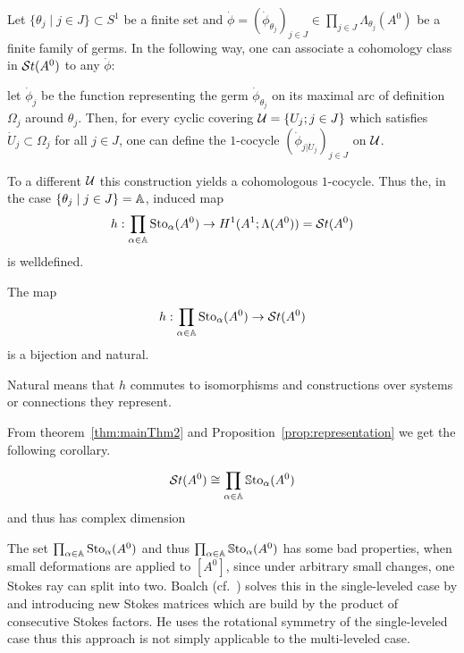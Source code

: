 Let $\{\theta_j\mid j\in J\}\subset S^1$ be a finite set and
$\dot\phi=(\dot\phi_{\theta_j})_{j\in J}
\in\prod_{j\in J}\Lambda_{\theta_j}(A^0)$ be a finite family of germs.
In the following way, one can associate a cohomology class in $\mathcal{S}{}t(A^0)$ to any
$\dot\phi$:
\begin{einr}
  let $\dot\phi_j$ be the function representing the germ
  $\dot\phi_{\theta_j}$ on its maximal arc of definition $\Omega_j$ around
  $\theta_j$.
  Then, for every cyclic covering $\mathcal{U}=\{U_j;j\in J\}$ which satisfies
  $\dot U_j\subset \Omega_j$ for all $j\in J$, one can define the $1$-cocycle
  $(\dot\phi_{j|\dot U_j})_{j\in J}$ on $\mathcal{U}$.
\end{einr}
To a different $\mathcal{U}$ this construction yields a cohomologous
$1$-cocycle\TODO[Proof]. Thus the, in the case $\{\theta_j\mid j\in J\}=\mathbb{A}$,
induced map
\[
  h:\prod_{\alpha\in\mathbb{A}}\operatorname{Sto}_\alpha(A^0)\to
  H^1(A^1;\Lambda(A^0))=\mathcal{S}{}t(A^0)
\]
is welldefined.
\begin{tthm}
  \label{thm:mainThm2}
  The map
  \[
    h:\prod_{\alpha\in\mathbb{A}}\operatorname{Sto}_\alpha(A^0)\to\mathcal{S}{}t(A^0)
  \]
  is a bijection and natural.
  \begin{s-rem}
    Natural means that $h$ commutes to isomorphisms and constructions over
    systems or connections they represent.
    \begin{comment}
      See \cite{Loday1994} Section III.3.3
    \end{comment}
  \end{s-rem}
\end{tthm}
From theorem~\ref{thm:mainThm2} and Proposition~\ref{prop:representation} we
get the following corollary.
\begin{cor}
  \[
    \mathcal{S}{}t(A^0) \cong \prod_{\alpha\in\mathbb{A}}\operatorname{\mathbb{S}to}_\alpha(A^0)
  \]
  and thus has complex dimension \TODO{}
\end{cor}
\begin{rem}
  The set $\prod_{\alpha\in\mathbb{A}}\operatorname{Sto}_\alpha(A^0)$ and thus
  $\prod_{\alpha\in\mathbb{A}}\operatorname{\mathbb{S}to}_\alpha(A^0)$ has some bad properties, when small
  deformations are applied to $[A^0]$, since under arbitrary small changes, one
  Stokes ray can split into two. Boalch (cf.~\cite{boalch,thboalch}) solves
  this in the single-leveled case by  and introducing new Stokes matrices which are build by the
  product of consecutive Stokes factors. He uses the rotational symmetry of the
  single-leveled case thus this approach is not simply applicable to the
  multi-leveled case.
\end{rem}

